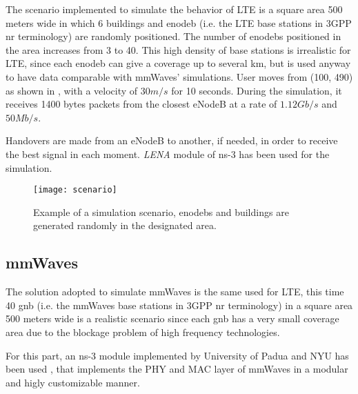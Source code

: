 The scenario implemented to simulate the behavior of LTE is a square area 500 meters wide in which 6 buildings and \gls{enodeb} (i.e. the LTE base stations in 3GPP \gls{nr} terminology) are randomly positioned.
The number of \gls{enodeb}s positioned in the area increases from 3 to 40. This high density of base stations is irrealistic for LTE, since each \gls{enodeb} can give a coverage up to several km, but is used anyway to have data comparable with \gls{mmWaves}' simulations.
User moves from (100, 490) as shown in , with a velocity of $30m/s$ for 10 seconds. During the simulation, it receives 1400 bytes packets from the closest eNodeB at a rate of $1.12 Gb/s$ and $50Mb/s$.

Handovers are made from an eNodeB to another, if needed, in order to receive the best signal in each moment. \textit{LENA} module of ns-3 has been used for the simulation.

\begin{figure}[ht]
\vspace{-0.2in}
  \texttt{[image: scenario]}
  \caption{Example of a simulation scenario, \gls{enodeb}s and buildings are generated randomly in the designated area.}
  \label{fig:scenario}
\end{figure}

\subsection{mmWaves}
The solution adopted to simulate \gls{mmWaves} is the same used for LTE, this time 40 \gls{gnb} (i.e. the mmWaves base stations in 3GPP \gls{nr} terminology) in a square area 500 meters wide is a realistic scenario since each \gls{gnb} has a very small coverage area due to the blockage problem of high frequency technologies.

For this part, an ns-3 module implemented by University of Padua and NYU has been used \cite{Mezzavilla18}, that implements the PHY and MAC layer of mmWaves in a modular and higly customizable manner.